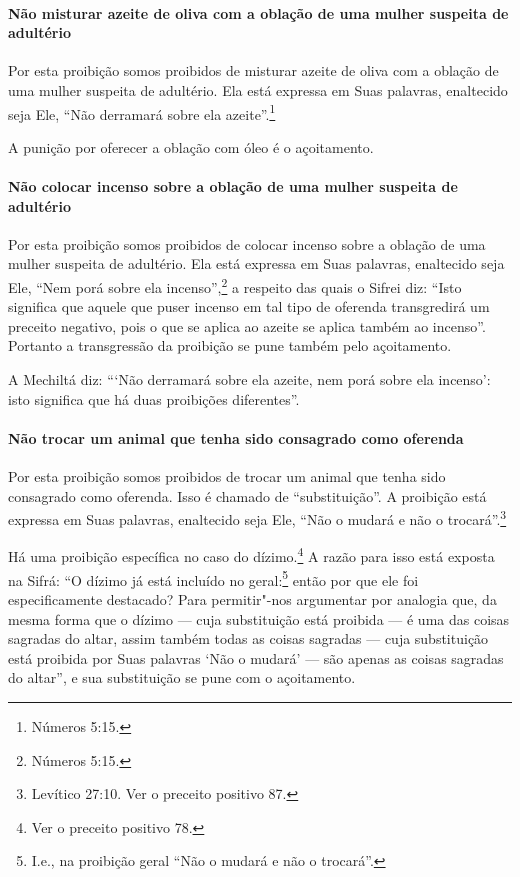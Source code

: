 \begin{multicols}{2}
\paragraph{Não misturar azeite de oliva com a oblação de uma mulher suspeita de
adultério}

Por esta proibição somos proibidos de misturar azeite de oliva com a
oblação de uma mulher suspeita de adultério. Ela está expressa em Suas
palavras, enaltecido seja Ele, ``Não derramará sobre ela azeite''.\footnote{Números 5:15.}

A punição por oferecer a oblação com óleo é o açoitamento.

\paragraph{Não colocar incenso sobre a oblação de uma mulher suspeita de adultério}

Por esta proibição somos proibidos de colocar incenso sobre a oblação
de uma mulher suspeita de adultério. Ela está expressa em Suas palavras,
enaltecido seja Ele, ``Nem porá sobre ela incenso'',\footnote{Números 5:15.} a
respeito das quais o Sifrei\starr{} diz: ``Isto significa que aquele que puser
incenso em tal tipo de oferenda transgredirá um preceito negativo, pois
o que se aplica ao azeite se aplica também ao incenso''. Portanto a
transgressão da proibição se pune também pelo açoitamento.

A Mechiltá\starr{} diz: ```Não derramará sobre ela azeite, nem porá sobre ela
incenso': isto significa que há duas proibições diferentes''.

\paragraph{Não trocar um animal que tenha sido consagrado como oferenda}

Por esta proibição somos proibidos de trocar um animal que tenha sido
consagrado como oferenda. Isso é chamado de ``substituição''. A
proibição está expressa em Suas palavras, enaltecido seja Ele, ``Não o
mudará e não o trocará''.\footnote{Levítico 27:10. Ver o preceito positivo 87.}

Há uma proibição específica no caso do dízimo.\footnote{Ver o preceito positivo 78.} A
razão para isso está exposta na Sifrá\starr: ``O dízimo já está incluído no
geral:\footnote{I.e., na proibição geral ``Não o mudará e não o trocará''.} então por que ele foi especificamente
destacado? Para permitir"-nos argumentar por analogia que, da mesma forma
que o dízimo --- cuja substituição está proibida --- é uma das coisas
sagradas do altar, assim também todas as coisas sagradas --- cuja
substituição está proibida por Suas palavras `Não o mudará' --- são
apenas as coisas sagradas do altar'', e sua substituição se pune com o
açoitamento.


\end{multicols}
